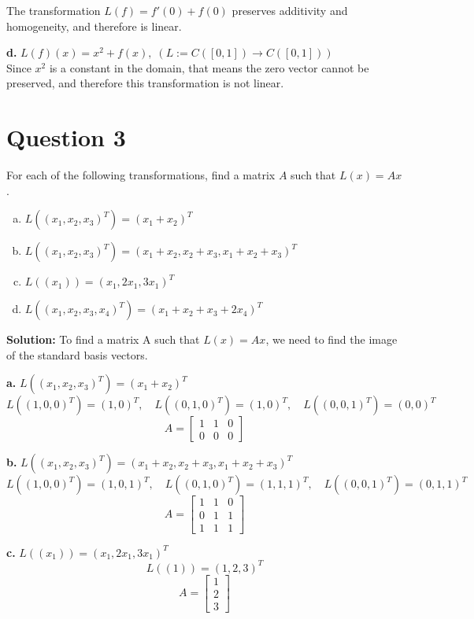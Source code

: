 \documentclass{article}
\begin{document}
\noindent The transformation $L(f) = f'(0) + f(0)$ preserves additivity and homogeneity, and therefore is linear.

\vspace{0.25cm}
\noindent\textbf{d.} $ L(f)(x) = x^2 + f(x), \; (L := C([0,1]) \to C([0,1])) $ \\
Since $x^2$ is a constant in the domain, that means the zero vector cannot be preserved, and therefore this transformation is not linear.

\newpage
\section*{Question 3}
For each of the following transformations, find a matrix $A$ such that $L(x) = Ax$.
\begin{enumerate}[a.]
    \item $ L((x_1, x_2, x_3)^T) = (x_1 + x_2)^T $
    \item $ L((x_1, x_2, x_3)^T) = (x_1 + x_2, x_2 + x_3, x_1 + x_2 + x_3)^T $
    \item $ L((x_1)) = (x_1, 2x_1, 3x_1)^T $
    \item $ L((x_1, x_2, x_3, x_4)^T) = (x_1 + x_2 + x_3 + 2x_4)^T $
\end{enumerate}

\noindent\textbf{Solution:} To find a matrix A such that $L(x) = Ax$, we need to find the image of the standard basis vectors.

\vspace{0.25cm}
\noindent\textbf{a.} $ L((x_1, x_2, x_3)^T) = (x_1 + x_2)^T $ \\
$$ L((1, 0, 0)^T) = (1, 0)^T, \quad L((0, 1, 0)^T) = (1, 0)^T, \quad L((0, 0, 1)^T) = (0, 0)^T $$
$$ A = \begin{bmatrix} 1 & 1 & 0 \\ 0 & 0 & 0 \end{bmatrix} $$

\vspace{0.25cm}
\noindent\textbf{b.} $ L((x_1, x_2, x_3)^T) = (x_1 + x_2, x_2 + x_3, x_1 + x_2 + x_3)^T $ \\
$$ L((1, 0, 0)^T) = (1, 0, 1)^T, \quad L((0, 1, 0)^T) = (1, 1, 1)^T, \quad L((0, 0, 1)^T) = (0, 1, 1)^T $$
$$ A = \begin{bmatrix} 1 & 1 & 0 \\ 0 & 1 & 1 \\ 1 & 1 & 1 \end{bmatrix} $$

\vspace{0.25cm}
\noindent\textbf{c.} $ L((x_1)) = (x_1, 2x_1, 3x_1)^T $ \\
$$ L((1)) = (1, 2, 3)^T $$
$$ A = \begin{bmatrix} 1 \\ 2 \\ 3 \end{bmatrix} $$
\end{document}
